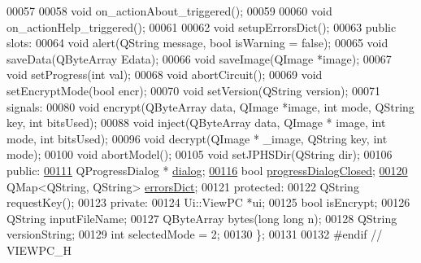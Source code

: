 \begin{DoxyCode}
00057 
00058     \textcolor{keywordtype}{void} on\_actionAbout\_triggered();
00059 
00060     \textcolor{keywordtype}{void} on\_actionHelp\_triggered();
00061 
00062     \textcolor{keywordtype}{void} setupErrorsDict();
00063 \textcolor{keyword}{public} slots:
00064     \textcolor{keywordtype}{void} alert(QString message, \textcolor{keywordtype}{bool} isWarning = \textcolor{keyword}{false});
00065     \textcolor{keywordtype}{void} saveData(QByteArray Edata);
00066     \textcolor{keywordtype}{void} saveImage(QImage *image);
00067     \textcolor{keywordtype}{void} setProgress(\textcolor{keywordtype}{int} val);
00068     \textcolor{keywordtype}{void} abortCircuit();
00069     \textcolor{keywordtype}{void} setEncryptMode(\textcolor{keywordtype}{bool} encr);
00070     \textcolor{keywordtype}{void} setVersion(QString version);
00071 signals:
00080     \textcolor{keywordtype}{void} encrypt(QByteArray data, QImage *image, \textcolor{keywordtype}{int} mode, QString key, \textcolor{keywordtype}{int} bitsUsed);
00088     \textcolor{keywordtype}{void} inject(QByteArray data, QImage * image, \textcolor{keywordtype}{int} mode, \textcolor{keywordtype}{int} bitsUsed);
00096     \textcolor{keywordtype}{void} decrypt(QImage * \_image, QString key, \textcolor{keywordtype}{int} mode);
00100     \textcolor{keywordtype}{void} abortModel();
00105     \textcolor{keywordtype}{void} setJPHSDir(QString dir);
00106 \textcolor{keyword}{public}:
\hypertarget{viewpc_8h_source.tex_l00111}{}\hyperlink{class_view_p_c_a31abbb470fe329b44e6ffee202b903ca}{00111}     QProgressDialog * \hyperlink{class_view_p_c_a31abbb470fe329b44e6ffee202b903ca}{dialog};
\hypertarget{viewpc_8h_source.tex_l00116}{}\hyperlink{class_view_p_c_add8c82aa2b0b934212aa5bde9277ab36}{00116}     \textcolor{keywordtype}{bool} \hyperlink{class_view_p_c_add8c82aa2b0b934212aa5bde9277ab36}{progressDialogClosed};
\hypertarget{viewpc_8h_source.tex_l00120}{}\hyperlink{class_view_p_c_aaf7f058e5589d65fec72a21abfd5629b}{00120}     QMap<QString, QString> \hyperlink{class_view_p_c_aaf7f058e5589d65fec72a21abfd5629b}{errorsDict};
00121 \textcolor{keyword}{protected}:
00122     QString requestKey();
00123 \textcolor{keyword}{private}:
00124     Ui::ViewPC *ui;
00125     \textcolor{keywordtype}{bool} isEncrypt;
00126     QString inputFileName;
00127     QByteArray bytes(\textcolor{keywordtype}{long} \textcolor{keywordtype}{long} n);
00128     QString versionString;
00129     \textcolor{keywordtype}{int} selectedMode = 2;
00130 \};
00131 
00132 \textcolor{preprocessor}{#endif // VIEWPC\_H}
\end{DoxyCode}
